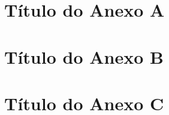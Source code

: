 \documentclass[
  12pt,		%
  a4paper,	%
  openright,%
  oneside,	%
  chapter=TITLE,		%
  section=TITLE,		%
  english,	%
  french,	%
  spanish,	%
  brazil	%
]{abntex2}
\begin{document}
    
    \begin{anexosenv}
    
        \chapter{Título do Anexo A}
            \lipsum[30]
      
        \chapter{Título do Anexo B}
            \lipsum[31]
        
        \chapter{Título do Anexo C}
            \lipsum[32]
      
    \end{anexosenv}
    
\end{document}
